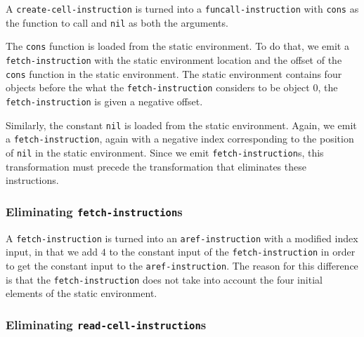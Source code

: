 A \texttt{create-cell-instruction} is turned into a
\texttt{funcall-instruction} with \texttt{cons} as the function to
call and \texttt{nil} as both the arguments.

The \texttt{cons} function is loaded from the static environment.  To
do that, we emit a \texttt{fetch-instruction} with the static
environment location and the offset of the \texttt{cons} function in
the static environment.  The static environment contains four objects
before the what the \texttt{fetch-instruction} considers to be object
$0$, the \texttt{fetch-instruction} is given a negative offset.

Similarly, the constant \texttt{nil} is loaded from the static
environment.  Again, we emit a \texttt{fetch-instruction}, again with
a negative index corresponding to the position of \texttt{nil} in the
static environment.  Since we emit \texttt{fetch-instruction}s, this
transformation must precede the transformation that eliminates
these instructions.%

\subsubsection{Eliminating \texttt{fetch-instruction}s}

A \texttt{fetch-instruction} is turned into an
\texttt{aref-instruction} with a modified index input, in that we add
$4$ to the constant input of the \texttt{fetch-instruction} in order
to get the constant input to the \texttt{aref-instruction}.  The
reason for this difference is that the \texttt{fetch-instruction} does
not take into account the four initial elements of the static
environment.

\subsubsection{Eliminating \texttt{read-cell-instruction}s}


